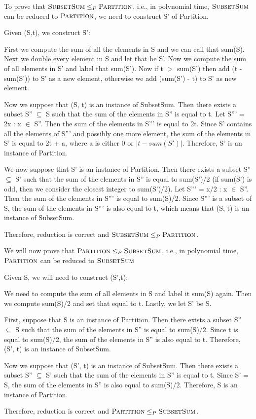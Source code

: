 \documentclass[12pt]{article}
\newcommand{\SubSum}{\textsf{\sc SubsetSum}}
\newcommand{\Partition}{\textsf{\sc Partition}}
\newenvironment{solution}{{\noindent\bf Solution:}}{\vspace{5mm}}
\begin{document}
\begin{solution}
      
      To prove that $\SubSum \leq_P \Partition$, i.e., in polynomial time, 
      $\SubSum$ can be reduced to $\Partition$, we need to construct S' of Partition.

      Given (S,t), we construct S':

      First we compute the sum of all the elements in S and we can call that sum(S).
      Next we double every element in S and let that be S'. Now we compute the sum of all elements
      in S' and label that sum(S'). Now if t $>$ sum(S') then add (t - sum(S')) to S' as a new element,
      otherwise we add (sum(S') - t) to S' as new element.

      Now we suppose that (S, t) is an instance of SubsetSum. 
      Then there exists a subset S'' $\subseteq$ S such that the sum of the elements in S'' is equal to t. 
      Let S''' = {2x : x $\in$ S''}. 
      Then the sum of the elements in S''' is equal to 2t. 
      Since S' contains all the elements of S''' and possibly one more element, 
      the sum of the elements in S' is equal to 2t + a, where a is either 0 or $|t - sum(S')|$. 
      Therefore, S' is an instance of Partition.

      We now suppose that S' is an instance of Partition. 
      Then there exists a subset S'' $\subseteq$ S' such that the sum of the elements in S'' is equal to sum(S')/2 (if sum(S') is odd, 
      then we consider the closest integer to sum(S')/2). Let S''' = {x/2 : x $\in$ S''}. Then the sum of the elements in S''' is equal to sum(S)/2. 
      Since S''' is a subset of S, the sum of the elements in S''' is also equal to t, which means that (S, t) is an instance of SubsetSum.

      Therefore, reduction is correct and $\SubSum \leq_P \Partition$.

      \vspace{0.5em} 

      We will now prove that $\Partition \leq_P \SubSum$, i.e., in polynomial time, 
      $\Partition$ can be reduced to $\SubSum$

      Given S, we will need to construct (S',t):

      We need to compute the sum of all elements in S and label it sum(S) again.
      Then we compute sum(S)/2 and set that equal to t. Lastly, we let S' be S.

      First, suppose that S is an instance of Partition. 
      Then there exists a subset S'' $\subseteq$ S such that the sum of the elements in S'' is equal to sum(S)/2. 
      Since t is equal to sum(S)/2, the sum of the elements in S'' is also equal to t. 
      Therefore, (S', t) is an instance of SubsetSum.

      Now we suppose that (S', t) is an instance of SubsetSum. 
      Then there exists a subset S'' $\subseteq$ S' such that the sum of the elements in S'' is equal to t. 
      Since S' = S, the sum of the elements in S'' is also equal to sum(S)/2. 
      Therefore, S is an instance of Partition.

      Therefore, reduction is correct and $\Partition \leq_P \SubSum$.
\end{solution}
\end{document}
